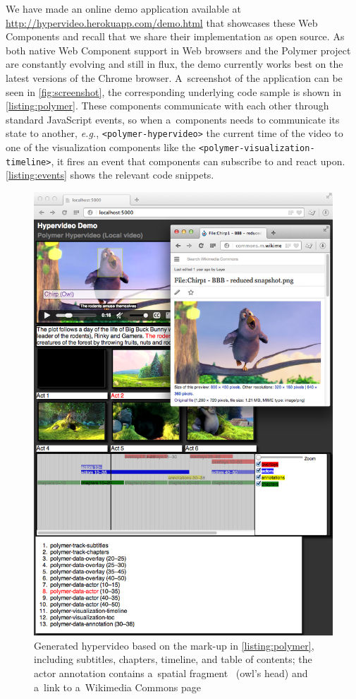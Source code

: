 \documentclass[runningheads,a4paper]{llncs}
\begin{document}
\noindent We have made an online demo application available at
\url{http://hypervideo.herokuapp.com/demo.html} that showcases these Web Components
and recall that we share their implementation as open source.
As both native Web Component support in Web browsers and the Polymer project
are constantly evolving and still in flux, the demo currently works best on
the latest versions of the Chrome browser.
A~screenshot of the application can be seen in \autoref{fig:screenshot},
the corresponding underlying code sample is shown in \autoref{listing:polymer}.
These components communicate with each other through standard JavaScript events,
so when a~components needs to communicate its state to another, \emph{e.g.},
\texttt{<polymer-hypervideo>} the current time of the video to one of the
visualization components like the \texttt{<polymer-visualization-timeline>},
it fires an event that components can subscribe to and react upon.
\autoref{listing:events} shows the relevant code snippets.

\begin{figure}[p!]
  \centering
  \includegraphics[width=0.95\linewidth]{screenshot}
  \caption{Generated hypervideo based on the mark-up in \autoref{listing:polymer},
  including subtitles, chapters, timeline, and table of contents;
  the actor annotation contains a~spatial fragment~\cite{troncy2012mediafragments}
  (owl's head) and a~link
  to a~Wikimedia Commons page}
  \label{fig:screenshot}
\end{figure}
\end{document}
